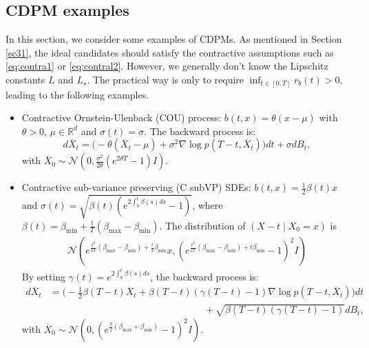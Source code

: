 \documentclass[letterpaper,11pt,reqno]{amsart}
\numberwithin{equation}{section}
\begin{document}
\subsection{CDPM examples}
\quad In this section, we consider some examples of CDPMs. 
As mentioned in Section \ref{sc31},
the ideal candidates should satisfy 
the contractive assumptions such as \eqref{eq:contra1} 
or \eqref{eq:contral2}.
However, we generally don't know the Lipschitz constants $L$ and $L_s$.
The practical way is only to require 
$\inf_{t\in\left[0,T\right]}r_b(t)>0$, 
leading to the following examples.
\begin{itemize}[itemsep = 3 pt]
\item 
Contractive Ornstein-Ulenback (COU) process: 
$b(t,x) = \theta (x - \mu)$ with $\theta > 0$, $\mu \in \mathbb{R}^d$ and $\sigma(t) = \sigma$.
The backward process is:
\begin{equation}
d\overline{X}_t = \bigg(-\theta (\overline{X}_t - \mu)  + \sigma^2 \nabla \log p(T-t, \overline{X}_t)\bigg)  dt + \sigma dB_t,
\end{equation}
with $\overline{X}_0 \sim \mathcal{N}\left(0,  
\frac{\sigma^2}{2\theta} ( e^{2 \theta T} -1) I \right)$.
\item 
Contractive sub-variance preserving (C subVP) SDEs:
$b(t,x) = \frac{1}{2} \beta(t)x$ and $\sigma(t) = \sqrt{\beta(t) (e^{2\int_0^t \beta(s) ds}-1)}$,
where $\beta(t)= \beta_{\min} + \frac{t}{T}(\beta_{\max} - \beta_{\min})$. The distribution of $(X-t\mid X_0=x)$ is
\begin{equation}
\begin{aligned}
\mathcal{N}\left( e^{\frac{t^2}{4T}(\beta_{\max} - \beta_{\min}) + \frac{t}{2} \beta_{\min}}  x,  
(e^{\frac{t^2}{2T}(\beta_{\max} - \beta_{\min}) + t \beta_{\min}}-1 )^2 I \right)
\end{aligned}
\end{equation}
By setting $\gamma(t)= e^{2 \int_0^t \beta(s) ds}$,
the backward process is: 
\begin{equation}
\begin{aligned}
d\overline{X}_t & = \bigg(-\frac{1}{2} \beta(T-t) \overline{X}_t  + \beta(T-t)(\gamma(T-t)-1) \nabla \log p(T-t, \overline{X}_t)\bigg)  dt \\
& \qquad \qquad \qquad \qquad \qquad \qquad \qquad \qquad+ \sqrt{\beta(T-t) (\gamma(T-t)-1)} dB_t,
\end{aligned}
\end{equation}
with $\overline{X}_0 \sim \mathcal{N}\left( 0, 
(e^{\frac{T}{2} (\beta_{\max} + \beta_{\min})}-1 )^2 I \right)$.
\end{itemize}
\end{document}
